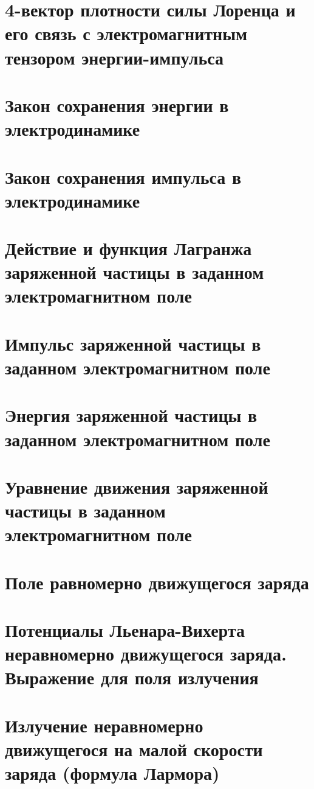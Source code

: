 \begin{multicols*}{2}
		\section{4-вектор плотности силы Лоренца и его связь с электромагнитным тензором энергии-импульса}
		
		\section{Закон сохранения энергии в электродинамике}
		
		\section{Закон сохранения импульса в электродинамике}
		
		\section{Действие и функция Лагранжа заряженной частицы в заданном электромагнитном поле}
		
		\section{Импульс заряженной частицы в заданном электромагнитном поле}
		
		\section{Энергия заряженной частицы в заданном электромагнитном поле}
		
		\section{Уравнение движения заряженной частицы в заданном электромагнитном поле}
		
		\section{Поле равномерно движущегося заряда}
		
		\section{Потенциалы Льенара-Вихерта неравномерно движущегося заряда. Выражение для поля излучения}
		
		\section{Излучение неравномерно движущегося на малой скорости заряда (формула Лармора)}
		

\end{multicols*}
